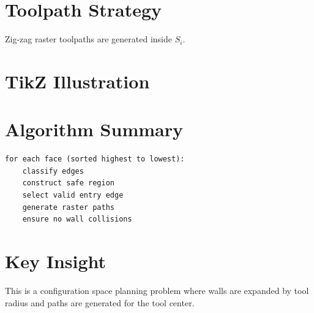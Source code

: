 \documentclass{article}
\begin{document}
\section*{Toolpath Strategy}
Zig-zag raster toolpaths are generated inside $S_i$.

\section*{TikZ Illustration}

\begin{center}
\end{center}

\section*{Algorithm Summary}
\begin{verbatim}
for each face (sorted highest to lowest):
    classify edges
    construct safe region
    select valid entry edge
    generate raster paths
    ensure no wall collisions
\end{verbatim}

\section*{Key Insight}
This is a configuration space planning problem where walls are expanded by tool radius and paths are generated for the tool center.
\end{document}
